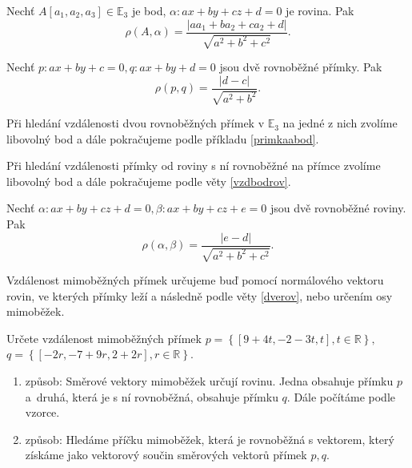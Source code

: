 \begin{veta}\label{vzdbodrov}
    Nechť $A[a_1,a_2,a_3]\in \mathbb E_3$ je bod, $\alpha:ax+by+cz+d=0$ je rovina. Pak
    $$\rho(A,\alpha)=\frac{|aa_1+ba_2+ca_2+d|}{\sqrt{a^2+b^2+c^2} }.$$
\end{veta}

\begin{veta}\label{vzdpr}
    Nechť $p:ax+by+c=0,q:ax+by+d=0$ jsou dvě rovnoběžné přímky. Pak
    $$\rho(p,q)=\frac{|d-c|}{\sqrt{a^2+b^2} }.$$
\end{veta}

\begin{pozn}
    Při hledání vzdálenosti dvou rovnoběžných přímek v $\mathbb E_3$ na jedné z nich zvolíme
    libovolný bod a dále pokračujeme podle příkladu \ref{primkaabod}.
\end{pozn}

\begin{pozn}
    Při hledání vzdálenosti přímky od roviny s ní rovnoběžné na přímce zvolíme
    libovolný bod a dále pokračujeme podle věty \ref{vzdbodrov}.
\end{pozn}

\begin{veta}\label{dverov}
    Nechť $\alpha:ax+by+cz+d=0,\beta:ax+by+cz+e=0$ jsou dvě rovnoběžné roviny. Pak
    $$\rho(\alpha,\beta)=\frac{|e-d|}{\sqrt{a^2+b^2+c^2} }.$$
\end{veta}

\begin{pozn}
    Vzdálenost mimoběžných přímek určujeme buď pomocí normálového vektoru rovin,
    ve kterých přímky leží a následně podle věty \ref{dverov}, nebo určením
    osy mimoběžek.
\end{pozn}

\begin{priklad}
Určete vzdálenost mimoběžných přímek $p=\left \{ [9+4t,-2-3t,t],t \in \mathbb R \right \},$ $q=\left \{ [-2r,-7+9r,2+2r],r \in \mathbb R \right \} $.
\end{priklad}

\begin{reseni}
\begin{enumerate}[1.]
\item způsob: Směrové vektory mimoběžek určují rovinu. Jedna obsahuje přímku $p$ a~druhá,
která je s ní rovnoběžná, obsahuje přímku $q$. Dále počítáme podle vzorce.
\item způsob: Hledáme příčku mimoběžek, která je rovnoběžná s vektorem, který
získáme jako vektorový součin směrových vektorů přímek $p,q$.
\end{enumerate}
\end{reseni}

